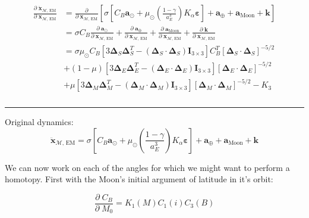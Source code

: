 \documentclass[]{article}
\newcommand{\pd}[2]{\frac{\partial\;#1}{\partial\;#2}}
\newcommand{\pddown}[2]{\frac{\partial}{\partial\;#2} \left[ #1 \right] }
\begin{document}
	\begin{align}
	\begin{split}
		\pd{\ddot{\mathbf{x}}_{\mathcal{M}\text{, EM}}}{ \mathbf{x}_{\mathcal{M}\text{, EM}} } 
		&= \pddown{\sigma \left[ C_B  \mathbf{a}_{\odot} + \mu_\odot \left(\frac{1-\gamma}{a_E^3}\right) K_\alpha \boldsymbol{\varepsilon} \right] + \mathbf{a}_\oplus +  \mathbf{a}_\text{Moon}  + \mathbf{k}}{ \mathbf{x}_{\mathcal{M}\text{, EM}} } \\
		&= \sigma C_B \pd{ \mathbf{a}_{\odot} }{ \mathbf{x}_{\mathcal{M}\text{, EM}} } + \pd{ \mathbf{a}_\oplus }{ \mathbf{x}_{\mathcal{M}\text{, EM}} } + \pd{ \mathbf{a}_\text{Moon} }{ \mathbf{x}_{\mathcal{M}\text{, EM}} } + \pd{ \mathbf{k} }{ \mathbf{x}_{\mathcal{M}\text{, EM}} } \\
		&= \sigma \mu_\odot C_B \left[ 3 \boldsymbol{\Delta}_S \boldsymbol{\Delta}_S^T - (\boldsymbol{\Delta}_S\cdot\boldsymbol{\Delta}_S) \mathbf{I}_{3\times 3} \right] C_B^T [\boldsymbol{\Delta}_S \cdot \boldsymbol{\Delta}_S]^{-5/2} \\
		&+ (1-\mu) \left[ 3 \boldsymbol{\Delta}_E \boldsymbol{\Delta}_E^T - (\boldsymbol{\Delta}_E\cdot\boldsymbol{\Delta}_E) \mathbf{I}_{3\times 3} \right] [\boldsymbol{\Delta}_E \cdot \boldsymbol{\Delta}_E ]^{-5/2} \\
		&+ \mu \left[ 3 \boldsymbol{\Delta}_M \boldsymbol{\Delta}_M^T - (\boldsymbol{\Delta}_M\cdot\boldsymbol{\Delta}_M) \mathbf{I}_{3\times 3} \right] [\boldsymbol{\Delta}_M \cdot \boldsymbol{\Delta}_M ]^{-5/2} - K_3 \\
	\end{split}
	\end{align}
	
	\hrule \vspace{1em}
	
	Original dynamics: 
	\begin{equation}
		\ddot{\mathbf{x}}_{\mathcal{M}\text{, EM}} = \sigma \left[ C_B  \mathbf{a}_{\odot} + \mu_\odot \left(\frac{1-\gamma}{a_E^3}\right) K_\alpha \boldsymbol{\varepsilon} \right] + \mathbf{a}_\oplus +  \mathbf{a}_\text{Moon}  + \mathbf{k}
	\end{equation}
	
	We can now work on each of the angles for which we might want to perform a homotopy.  First with the Moon's initial argument of latitude in it's orbit:
	
	\begin{equation*}
		\pd{C_B}{M_0} = K_1(M) C_1(i) C_3(B)
	\end{equation*}
	
\end{document}
